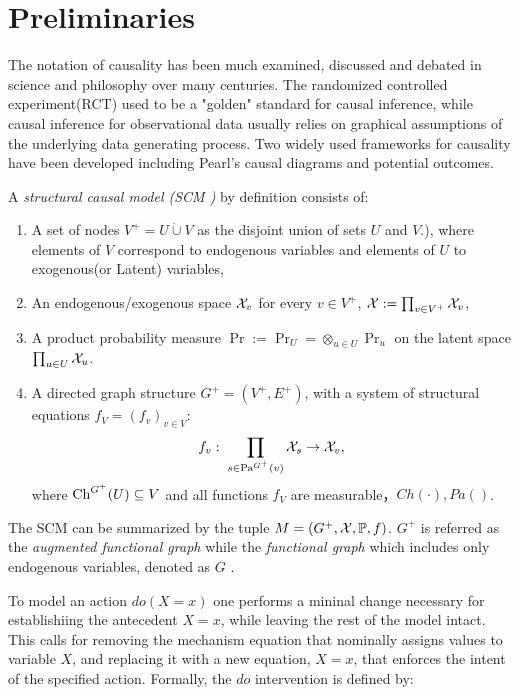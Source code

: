 \section{Preliminaries}

 
The notation of causality has been much examined, discussed and debated in science and philosophy over many centuries. The randomized controlled experiment(RCT) used to be a "golden" standard for causal inference, while causal inference for observational data usually relies on graphical assumptions of the underlying data generating process. Two widely used frameworks for causality have been developed including Pearl's causal diagrams and potential outcomes.


\begin{Def}
	\label{SCM-def}
	A \emph{structural causal model (SCM \cite{Pearl2009, Pearl2018})} by definition consists of: 
	\begin{enumerate}
		\setlength\itemsep{0em}
		\item A set of nodes $V^+=U \dot \cup V$ as the disjoint union of sets $U$ and $V$.), where elements of $V$ correspond to endogenous variables and elements of $U$ to exogenous(or Latent) variables,
		\item An endogenous/exogenous space $\mathcal{X}_v$ for every $v \in V^+$, $\mathcal{X}:=\prod_{v \in V^+}\mathcal{X}_v$,
		\item A product probability measure $\Pr:=\Pr_U=\otimes_{u \in U} \Pr_u$ on the latent space $\prod_{u \in U} \mathcal{X}_u$. 
		
		\item A directed graph structure $G^+=(V^+, E^+)$, with a system of structural equations  $f_V = (f_v)_{v \in V}$:
		\[f_v: \; \prod_{s \in  \mathrm{Pa}^{G^+}(v)}\mathcal{X}_s \to \mathcal{X}_v,\]
		where $\mathrm{Ch}^{G^+}(U) \subseteq V$ and all functions $f_V$ are measurable，$Ch(\cdot ), Pa()$. 
	\end{enumerate}
	The SCM can be summarized by the tuple $M=(G^+,\mathcal{X},\mathbb{P}, f)$. $G^+$ is referred as the \emph{augmented functional graph} while the \emph{functional graph} which includes only endogenous variables, denoted as $G$ . 
\end{Def}


To model an action $do(X=x)$ one performs a mininal change necessary for establishiing the antecedent $X=x$, while leaving the rest of the model intact. This calls for removing the mechanism equation that nominally assigns values to variable $X$, and replacing it with a new equation, $X=x$, that enforces the intent of the specified action.  Formally, the $do$ intervention is defined by:

